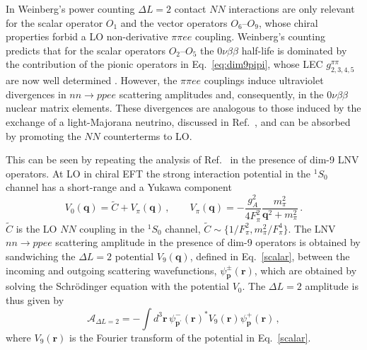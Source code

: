\documentclass[letterpaper,11pt]{article}
\newcommand{\Dt}{\Delta}
\renewcommand{\vec}[1]{{\mathbf #1}}
\begin{document}
In Weinberg's power counting $\Delta L =2$ contact $N\!N$ interactions are only relevant for the scalar operator $O_1$
and the vector operators $O_{6}$--$O_9$, whose chiral properties forbid a LO non-derivative $\pi \pi e e$ coupling. 
Weinberg's counting predicts that for the scalar operators $O_{2}$--$O_5$
the $0\nu\beta\beta$ half-life is dominated by the contribution of the pionic operators in Eq.\ \eqref{eq:dim9pipi}, whose LEC  $g^{\pi\pi}_{2,3,4,5}$ are now well determined \cite{Cirigliano:2017ymo,Nicholson:2016byl,Nicholson:2018mwc}.
However, the $\pi\pi ee$ couplings  induce ultraviolet divergences in $nn \rightarrow p p e e$ scattering amplitudes
and, consequently, in the $0\nu\beta\beta$ nuclear matrix elements. These divergences are analogous to those induced by the exchange of a light-Majorana neutrino, discussed in Ref.\ \cite{Cirigliano:2018hja},
and can be absorbed by promoting the $N\!N$ counterterms to LO.



This can be seen by  repeating the analysis of Ref.\ \cite{Cirigliano:2018hja} in the presence of dim-9 LNV operators. 
At LO in  chiral EFT the strong interaction potential in the $^1S_0$ channel has a short-range and a Yukawa component
\begin{equation}\label{strong}
V_0(\vec q) = \tilde C + V_{\pi}(\vec q)\,, \qquad V_{\pi}(\vec q) = -\frac{g_A^2}{4 F_\pi^2} \frac{m_\pi^2}{\vec q^2 + m_\pi^2}\,.
\end{equation}
$\tilde C$ is the LO $N\!N$ coupling in the $^1S_0$ channel, $\tilde C \sim \{1/F_\pi^2,m_\pi^2/F_\pi^4\}$.
The LNV $n n \rightarrow p p e e$ scattering amplitude in the presence of dim-9 operators 
is obtained by sandwiching the $\Dt L=2$ potential $V_9(\vec q)$, defined in  Eq.\ \eqref{scalar}, between 
the incoming and outgoing scattering wavefunctions, $\psi_{\vec p}^{\pm}(\vec r)$,  which are obtained by solving the Schr\"odinger  equation with the potential $V_0$. The $\Dt L=2$ amplitude is thus given by
\begin{equation}\label{AL2}
\mathcal A_{\Delta L =2} =  - \int d^3 \vec r \, \psi^-_{\vec p^\prime}(\vec r)^* V_9(\vec r)  \psi^+_{\vec p} (\vec r)\,,
\end{equation}
where $V_9(\vec r)$ is the Fourier transform of the potential in Eq.\ \eqref{scalar}.
\end{document}
